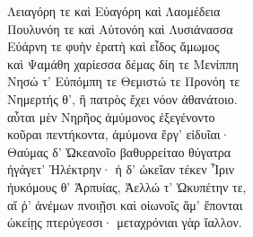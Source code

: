 \begin{pages}
\begin{Leftside}
Λειαγόρη τε καὶ Εὐαγόρη καὶ Λαομέδεια \\
Πουλυνόη τε καὶ Αὐτονόη καὶ Λυσιάνασσα\\
Εὐάρνη τε φυὴν ἐρατὴ καὶ εἶδος ἄμωμος\\
καὶ Ψαμάθη χαρίεσσα δέμας δίη τε Μενίππη \\
Νησώ τ' Εὐπόμπη τε Θεμιστώ τε Προνόη τε\\
Νημερτής θ', ἣ πατρὸς ἔχει νόον ἀθανάτοιο.\\
αὗται μὲν Νηρῆος ἀμύμονος ἐξεγένοντο\\
κοῦραι πεντήκοντα, ἀμύμονα ἔργ' εἰδυῖαι· \\

\quad{}Θαύμας δ' Ὠκεανοῖο βαθυρρείταο θύγατρα \\
ἠγάγετ' Ἠλέκτρην· ἡ δ' ὠκεῖαν τέκεν Ἶριν \\
ἠυκόμους θ' Ἁρπυίας, Ἀελλώ τ' Ὠκυπέτην τε, \\
αἵ ῥ' ἀνέμων πνοιῇσι καὶ οἰωνοῖς ἅμ' ἕπονται\\
ὠκείῃς πτερύγεσσι· μεταχρόνιαι γὰρ ἴαλλον. \\[5pt]


\end{Leftside}
\end{pages}
